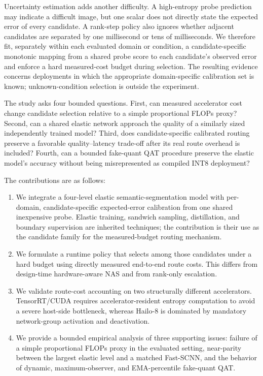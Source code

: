 \documentclass[a4paper,review,12pt]{elsarticle}
\begin{document}
Uncertainty estimation adds another difficulty. A high-entropy probe prediction may indicate a difficult image, but one scalar does not directly state the expected error of every candidate. A rank-step policy also ignores whether adjacent candidates are separated by one millisecond or tens of milliseconds. We therefore fit, separately within each evaluated domain or condition, a candidate-specific monotonic mapping from a shared probe score to each candidate's observed error and enforce a hard measured-cost budget during selection. The resulting evidence concerns deployments in which the appropriate domain-specific calibration set is known; unknown-condition selection is outside the experiment.

The study asks four bounded questions. First, can measured accelerator cost change candidate selection relative to a simple proportional FLOPs proxy? Second, can a shared elastic network approach the quality of a similarly sized independently trained model? Third, does candidate-specific calibrated routing preserve a favorable quality--latency trade-off after its real route overhead is included? Fourth, can a bounded fake-quant QAT procedure preserve the elastic model's accuracy without being misrepresented as compiled INT8 deployment?

The contributions are as follows:
\begin{enumerate}
    \item We integrate a four-level elastic semantic-segmentation model with per-domain, candidate-specific expected-error calibration from one shared inexpensive probe. Elastic training, sandwich sampling, distillation, and boundary supervision are inherited techniques; the contribution is their use as the candidate family for the measured-budget routing mechanism.
    \item We formulate a runtime policy that selects among those candidates under a hard budget using directly measured end-to-end route costs. This differs from design-time hardware-aware NAS and from rank-only escalation.
    \item We validate route-cost accounting on two structurally different accelerators. TensorRT/CUDA requires accelerator-resident entropy computation to avoid a severe host-side bottleneck, whereas Hailo-8 is dominated by mandatory network-group activation and deactivation.
    \item We provide a bounded empirical analysis of three supporting issues: failure of a simple proportional FLOPs proxy in the evaluated setting, near-parity between the largest elastic level and a matched Fast-SCNN, and the behavior of dynamic, maximum-observer, and EMA-percentile fake-quant QAT.
\end{enumerate}
\end{document}
